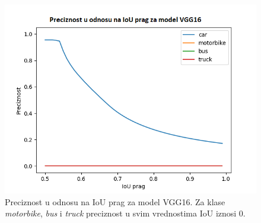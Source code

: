 \documentclass[12pt,oneside]{memoir}
\begin{document}
\begin{figure}[!ht]
    \centering
    \includegraphics[width=1\textwidth]{matfmaster/glava4/precision_vs_iou_threshold_VGG16.png}
    \caption{Preciznost u odnosu na IoU prag za model VGG16. Za klase \textit{motorbike}, \textit{bus} i \textit{truck} preciznost u svim vrednostima IoU iznosi 0.}
    \label{fig:section4_vgg16_prc}
\end{figure}
\end{document}
